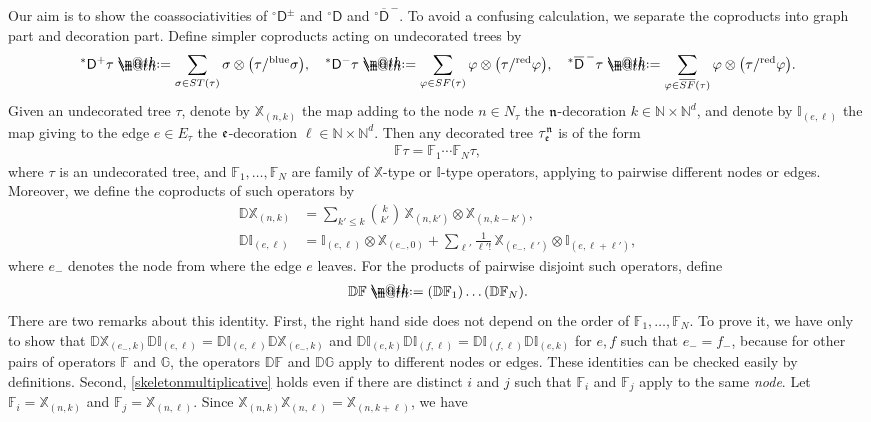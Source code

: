 \documentclass[10pt, reqno]{amsart}
\makeatletter
\numberwithin{subsection}{section}
\numberwithin{subsubsection}{subsection}
\numberwithin{equation}{section} %
\theoremstyle{mystyle}
\theoremstyle{mystyle2}
\theoremstyle{mystyle3}
\newcommand{\bbF}{\mathbb{F}}
\newcommand{\bbD}{\mathbb{D}}
\newcommand{\sfD}{\mathsf{D}}
\newcommand{\ssk}{\smallskip}
\newcommand{\bbG}{\mathbb{G}}
\newcommand\bbI{\mathbb{I}}
\newcommand\bbN{\mathbb{N}}
\newcommand{\bbX}{\mathbb{X}}
\newcommand*{\defeq}{\mathrel{\rlap{%
                     \raisebox{0.3ex}{$\m@th\cdot$}}%
                     \raisebox{-0.3ex}{$\m@th\cdot$}}%
                     =}
\makeatother
\begin{document}
\ssk

Our aim is to show the coassociativities of ${^\circ}\sfD^\pm$ and ${^\circ}{\sfD}$ and ${^\circ}\overline{\sfD}^{\,-}$. To avoid a confusing calculation, we separate the coproducts into graph part and decoration part. Define simpler coproducts acting on undecorated trees by
\begin{align*}
{^*}{\sf D}^+\tau \defeq  \sum_{\sigma\in ST(\tau)}\sigma\otimes\big(\tau/^{\text{blue}}\sigma\big),\quad
{^*}{\sf D}^-\tau \defeq  \sum_{\varphi\in SF(\tau)}\varphi\otimes\big(\tau/^{\text{red}}\varphi\big),\quad
{^*}\overline{\sf D}^{\,-}\tau \defeq  \sum_{\varphi\in\overline{SF}(\tau)}\varphi\otimes\big(\tau/^{\text{red}}\varphi\big).
\end{align*}
Given an undecorated tree $\tau$, denote by $\bbX_{(n,k)}$ the map {\color{red}adding}
to the node $n\in N_\tau$ the $\frak{n}$-decoration $k\in\bbN\times\bbN^d$, and denote by $\bbI_{(e,\ell)}$ the map giving to the edge $e\in E_\tau$ the $\frak{e}$-decoration $\ell\in\bbN\times\bbN^d$. Then any decorated tree $\tau_{\frak{e}}^{\frak{n}}$ is of the form
\begin{align}\label{decoration map on tau}
\bbF\tau =\bbF_1\cdots\bbF_N\tau,
\end{align}
where $\tau$ is an undecorated tree, and $\bbF_1,\dots,\bbF_N$ are family of $\bbX$-type or $\bbI$-type operators, applying to pairwise different nodes or edges. Moreover, we define the coproducts of such operators by
\begin{align*}
\bbD\bbX_{(n,k)} &= \sum_{k'\le k}\binom{k}{k'}\,\bbX_{(n,k')}\otimes\bbX_{(n,k-k')},\\
\bbD\bbI_{(e,\ell)} &= \bbI_{(e,\ell)}\otimes\bbX_{(e_-,0)} + \sum_{\ell'}\frac1{\ell'!}\,\bbX_{(e_-,\ell')}\otimes\bbI_{(e,\ell+\ell')},
\end{align*}
where $e_-$ denotes the node from where the edge $e$ leaves. For the products of pairwise disjoint such operators, define 
\begin{align}\label{skeletonmultiplicative}
\bbD\bbF\defeq (\bbD\bbF_1)\dots(\bbD\bbF_N).
\end{align}
There are two remarks about this identity. First, the right hand side does not depend on the order of $\bbF_1,\dots,\bbF_N$. To prove it, we have only to show that $\bbD\bbX_{(e_-,k)}\bbD\bbI_{(e,\ell)}=\bbD\bbI_{(e,\ell)}\bbD\bbX_{(e_-,k)}$ and $\bbD\bbI_{(e,k)}\bbD\bbI_{(f,\ell)}=\bbD\bbI_{(f,\ell)}\bbD\bbI_{(e,k)}$ for $e,f$ such that $e_-=f_-$, because for other pairs of operators $\bbF$ and $\bbG$, the operators $\bbD\bbF$ and $\bbD\bbG$ apply to different nodes or edges. These identities can be checked easily by definitions. Second, \eqref{skeletonmultiplicative} holds even if there are distinct $i$ and $j$ such that $\bbF_i$ and $\bbF_j$ apply to the same {\sl node}. Let $\bbF_i=\bbX_{(n,k)}$ and $\bbF_j=\bbX_{(n,\ell)}$. Since $\bbX_{(n,k)}\bbX_{(n,\ell)}=\bbX_{(n,k+\ell)}$, we have
\end{document}
